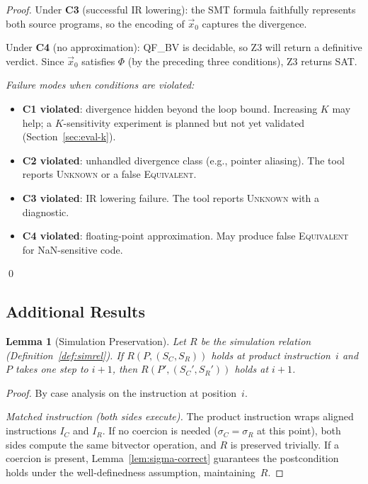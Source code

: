 \documentclass[10pt,a4paper]{article}
\newtheorem{lemma}[theorem]{Lemma}
\begin{document}
\begin{appendices}
\begin{proof}
Under \textbf{C3} (successful IR lowering): the SMT formula
faithfully represents both source programs, so the encoding of
$\vec{x}_0$ captures the divergence.

Under \textbf{C4} (no approximation): QF\_BV is decidable, so Z3
will return a definitive verdict.  Since $\vec{x}_0$ satisfies
$\Phi$ (by the preceding three conditions), Z3 returns SAT.

\emph{Failure modes when conditions are violated:}
\begin{itemize}[nosep]
  \item \textbf{C1 violated}: divergence hidden beyond the loop
    bound.  Increasing $K$ may help; a $K$-sensitivity experiment
    is planned but not yet validated
    (Section~\ref{sec:eval-k}).
  \item \textbf{C2 violated}: unhandled divergence class (e.g.,
    pointer aliasing).  The tool reports \textsc{Unknown} or a
    false \textsc{Equivalent}.
  \item \textbf{C3 violated}: IR lowering failure.  The tool
    reports \textsc{Unknown} with a diagnostic.
  \item \textbf{C4 violated}: floating-point approximation.  May
    produce false \textsc{Equivalent} for NaN-sensitive code.
\end{itemize}
\qed
\end{proof}

\subsection{Additional Results}

\begin{lemma}[Simulation Preservation]\label{lem:sim-pres}
Let $R$ be the simulation relation
(Definition~\ref{def:simrel}).  If $R(P, (S_C, S_R))$ holds at
product instruction~$i$ and $P$ takes one step to $i+1$, then
$R(P', (S_C', S_R'))$ holds at $i+1$.
\end{lemma}

\begin{proof}
By case analysis on the instruction at position~$i$.

\emph{Matched instruction (both sides execute).}
The product instruction wraps aligned instructions $I_C$ and $I_R$.
If no coercion is needed ($\sigma_C = \sigma_R$ at this point),
both sides compute the same bitvector operation, and $R$ is preserved
trivially.  If a coercion is present, Lemma~\ref{lem:sigma-correct}
guarantees the postcondition holds under the well-definedness
assumption, maintaining~$R$.


\end{proof}
\end{appendices}
\end{document}
